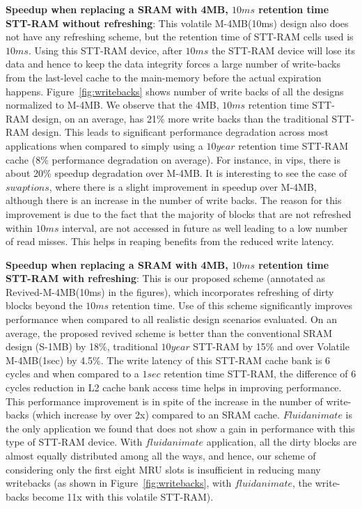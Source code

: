 {\bf Speedup when replacing a SRAM with 4MB, $10ms$ retention time STT-RAM without refreshing}: This volatile M-4MB(10ms) design also does not have any refreshing scheme, but the retention time of STT-RAM cells used is $10ms$. Using this STT-RAM device, after $10ms$ the STT-RAM device will lose its data and hence to keep the data integrity forces a large number of write-backs from the last-level cache to the main-memory before the actual expiration happens. Figure~\ref{fig:writebacks} shows number of write backs of all the designs normalized to M-4MB. We observe that the 4MB, $10ms$ retention time STT-RAM design, on an average, has 21\% more write backs than the traditional STT-RAM design.
This leads to significant performance degradation across most applications when compared to simply using a $10year$ retention time STT-RAM cache (8\% performance degradation on average). For instance, in vips, there is about 20\% speedup degradation over M-4MB. It is interesting to see the case of $swaptions$, where there is a slight improvement in speedup over M-4MB, although there is an increase in the number of write backs. The reason for this improvement is due to the fact that the majority of blocks that are not refreshed within $10ms$ interval, are not accessed in future as well leading to a low number of read misses. This helps in reaping benefits from the reduced write latency.

{\bf Speedup when replacing a SRAM with 4MB, $10ms$ retention time STT-RAM with refreshing}: This is our proposed scheme (annotated as Revived-M-4MB(10ms) in the figures), which incorporates refreshing of dirty blocks beyond the $10ms$ retention time.
Use of this scheme significantly improves performance when compared to all realistic design scenarios evaluated. On an average, the proposed revived scheme is better than the conventional SRAM design (S-1MB) by 18\%, traditional $10year$ STT-RAM by 15\% and over Volatile M-4MB(1sec)
by 4.5\%. The write latency of this STT-RAM cache bank is 6 cycles and when compared to a $1sec$ retention time STT-RAM, the difference of 6 cycles reduction in L2 cache bank access time helps in improving performance. This performance improvement is in spite of the increase in the number of write-backs (which increase by over 2x) compared to an SRAM cache. $Fluidanimate$ is the only application we found that does not show a gain in performance with this type of STT-RAM device. With $fluidanimate$ application, all the dirty blocks are almost equally distributed among all the ways, and hence, our scheme of considering only the first eight MRU slots is insufficient in reducing many writebacks (as shown in Figure~\ref{fig:writebacks}, with $fluidanimate$, the write-backs become 11x with this volatile STT-RAM).

